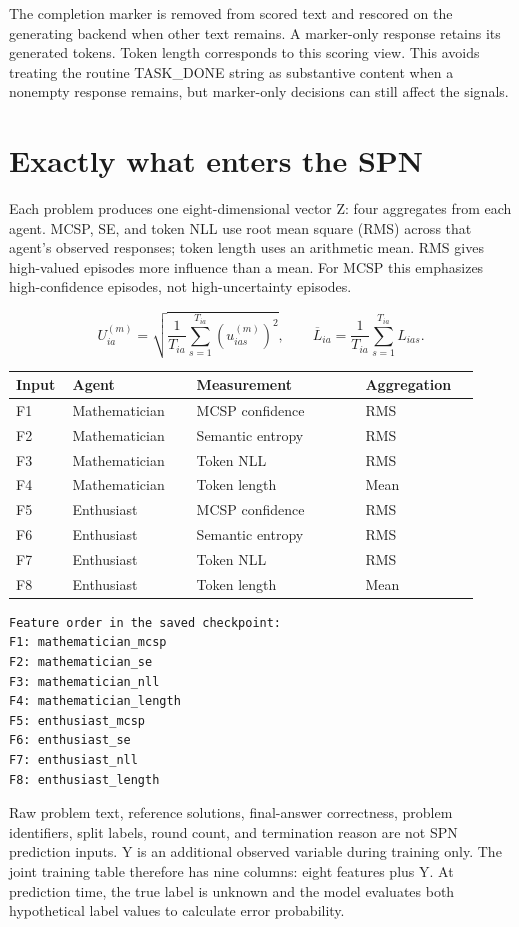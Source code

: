 \documentclass[11pt,a4paper]{article}
\begin{document}
The completion marker is removed from scored text and rescored on the generating backend when other text remains. A marker-only response retains its generated tokens. Token length corresponds to this scoring view. This avoids treating the routine TASK\_DONE string as substantive content when a nonempty response remains, but marker-only decisions can still affect the signals.

\section{Exactly what enters the SPN}
Each problem produces one eight-dimensional vector Z: four aggregates from each agent. MCSP, SE, and token NLL use root mean square (RMS) across that agent's observed responses; token length uses an arithmetic mean. RMS gives high-valued episodes more influence than a mean. For MCSP this emphasizes high-confidence episodes, not high-uncertainty episodes.

\begin{equation*}
U_{ia}^{(m)}=\sqrt{\frac{1}{T_{ia}}\sum_{s=1}^{T_{ia}}(u_{ias}^{(m)})^2},\qquad \overline L_{ia}=\frac{1}{T_{ia}}\sum_{s=1}^{T_{ia}}L_{ias}.
\end{equation*}
\begin{center}\small\setlength{\tabcolsep}{3pt}
\begin{tabular}{>{\raggedright\arraybackslash}p{0.100\linewidth}>{\raggedright\arraybackslash}p{0.250\linewidth}>{\raggedright\arraybackslash}p{0.340\linewidth}>{\raggedright\arraybackslash}p{0.230\linewidth}}
\toprule
Input & Agent & Measurement & Aggregation \\\midrule
F1 & Mathematician & MCSP confidence & RMS \\
F2 & Mathematician & Semantic entropy & RMS \\
F3 & Mathematician & Token NLL & RMS \\
F4 & Mathematician & Token length & Mean \\
F5 & Enthusiast & MCSP confidence & RMS \\
F6 & Enthusiast & Semantic entropy & RMS \\
F7 & Enthusiast & Token NLL & RMS \\
F8 & Enthusiast & Token length & Mean \\
\bottomrule\end{tabular}\end{center}
\begin{verbatim}
Feature order in the saved checkpoint:
F1: mathematician_mcsp
F2: mathematician_se
F3: mathematician_nll
F4: mathematician_length
F5: enthusiast_mcsp
F6: enthusiast_se
F7: enthusiast_nll
F8: enthusiast_length
\end{verbatim}
Raw problem text, reference solutions, final-answer correctness, problem identifiers, split labels, round count, and termination reason are not SPN prediction inputs. Y is an additional observed variable during training only. The joint training table therefore has nine columns: eight features plus Y. At prediction time, the true label is unknown and the model evaluates both hypothetical label values to calculate error probability.
\end{document}
